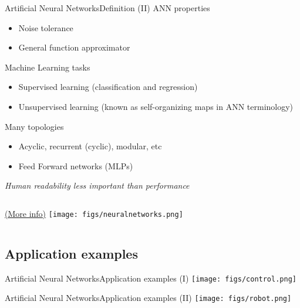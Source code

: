 \documentclass[10pt,compress]{beamer} %
\begin{document}
\begin{frame}{Artificial Neural Networks}{Definition (II)}
	ANN properties
	\begin{itemize}
	\item Noise tolerance
	\item General function approximator
	\end{itemize}

	Machine Learning tasks
	\begin{itemize}
	\item Supervised learning (classification and regression)
	\item Unsupervised learning (known as \alert{self-organizing maps} in ANN terminology)
	\end{itemize}

	Many topologies
	\begin{itemize}
		\item Acyclic, recurrent (cyclic), modular, etc
		\item Feed Forward networks (MLPs)
	\end{itemize}

	\centering \textit{Human readability less important than performance}
\end{frame}

\begin{frame}[plain]{}{}
\vspace{-0.2cm}
\begin{center}
    \begin{columns}
	\href{http://www.asimovinstitute.org/neural-network-zoo/}{(More info)}
	\texttt{[image: figs/neuralnetworks.png]}
	\end{columns}
\end{center}
\end{frame}

\subsection{Application examples}
\begin{frame}{Artificial Neural Networks}{Application examples (I)}
	\centering\texttt{[image: figs/control.png]}
\end{frame}

\begin{frame}{Artificial Neural Networks}{Application examples (II)}
	\centering\texttt{[image: figs/robot.png]}
\end{frame}
\end{document}
